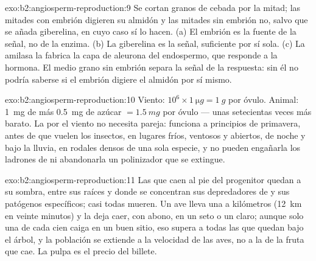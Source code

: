 \begin{solution}{exo:b2:angiosperm-reproduction:9}
Se cortan granos de cebada por la mitad; las mitades con embrión digieren
su almidón y las mitades sin embrión no, salvo que se añada giberelina,
en cuyo caso sí lo hacen. (a) El embrión es la fuente de la señal, no de
la enzima. (b) La giberelina es la señal, suficiente por sí sola. (c) La
amilasa la fabrica la capa de aleurona del endospermo, que responde a la
hormona. El medio grano sin embrión separa la señal de la respuesta: sin
él no podría saberse si el embrión digiere el almidón por sí mismo.
\end{solution}

\begin{solution}{exo:b2:angiosperm-reproduction:10}
Viento: $10^{6}\times\qty{1}{\micro g} = \qty{1}{g}$ por óvulo. Animal:
\qty{1}{mg} de  más \qty{0.5}{mg} de azúcar $= \qty{1.5}{mg}$
por óvulo --- unas setecientas veces más barato. La  por el
viento no necesita pareja: funciona a principios de primavera, antes de
que vuelen los insectos, en lugares fríos, ventosos y abiertos, de noche
y bajo la lluvia, en rodales densos de una sola especie, y no pueden
engañarla los ladrones de  ni abandonarla un polinizador que se
extingue.
\end{solution}

\begin{solution}{exo:b2:angiosperm-reproduction:11}
Las  que caen al pie del progenitor quedan a su sombra, entre sus
raíces y donde se concentran sus depredadores de  y sus
patógenos específicos; casi todas mueren. Un ave lleva una  a
kilómetros (\qty{12}{km} en veinte minutos) y la deja caer, con abono, en
un seto o un claro; aunque solo una  de cada cien caiga en un buen
sitio, eso supera a todas las  que quedan bajo el árbol, y la
población se extiende a la velocidad de las aves, no a la de la fruta que
cae. La pulpa es el precio del billete.
\end{solution}

